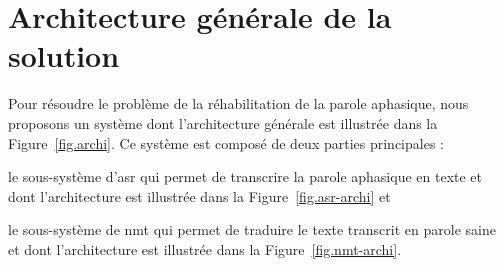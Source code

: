 \section{Architecture générale de la solution}%
\label{sec.conception.archi}

Pour résoudre le problème de la réhabilitation de la parole aphasique,
nous proposons un système dont l'architecture générale est illustrée dans la Figure~\ref{fig.archi}.
Ce système est composé de deux parties principales :
\begin{enumerate*}[label=(\alph*)]
    \item le sous-système d'\gls{asr} qui permet de transcrire la parole aphasique en texte
    et dont l'architecture est illustrée dans la Figure~\ref{fig.asr-archi} et
    \item le sous-système de \gls{nmt} qui permet de traduire le texte transcrit en parole saine
    et dont l'architecture est illustrée dans la Figure~\ref{fig.nmt-archi}.
\end{enumerate*}

